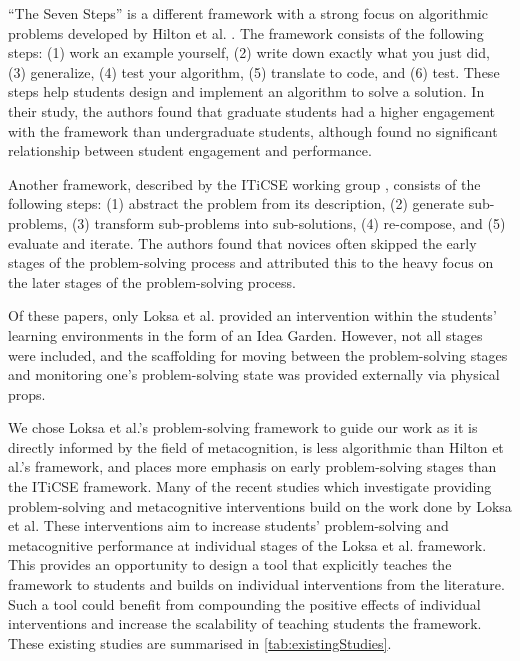 \documentclass[sigconf,anonymous]{acmart}
\begin{document}
“The Seven Steps” is a different framework with a strong focus on algorithmic problems developed by Hilton et al. \cite{hilton2019}. The framework consists of the following steps: (1) work an example yourself, (2) write down exactly what you just did, (3) generalize, (4) test your algorithm, (5) translate to code, and (6) test. These steps help students design and implement an algorithm to solve a solution. In their study, the authors found that graduate students had a higher engagement with the framework than undergraduate students, although found no significant relationship between student engagement and performance.

Another framework, described by the ITiCSE working group \cite{mccracken2001}, consists of the following steps: (1) abstract the problem from its description, (2) generate sub-problems, (3) transform sub-problems into sub-solutions, (4) re-compose, and (5) evaluate and iterate. The authors found that novices often skipped the early stages of the problem-solving process and attributed this to the heavy focus on the later stages of the problem-solving process.

Of these papers, only Loksa et al. provided an intervention within the students' learning environments in the form of an Idea Garden. However, not all stages were included, and the scaffolding for moving between the problem-solving stages and monitoring one's problem-solving state was provided externally via physical props.

We chose Loksa et al.'s problem-solving framework to guide our work as it is directly informed by the field of metacognition, is less algorithmic than Hilton et al.'s framework, and places more emphasis on early problem-solving stages than the ITiCSE framework. Many of the recent studies which investigate providing problem-solving and metacognitive interventions build on the work done by Loksa et al. These interventions aim to increase students' problem-solving and metacognitive performance at individual stages of the Loksa et al. framework. This provides an opportunity to design a tool that explicitly teaches the framework to students and builds on individual interventions from the literature. Such a tool could benefit from compounding the positive effects of individual interventions and increase the scalability of teaching students the framework. These existing studies are summarised in \autoref{tab:existingStudies}.
\end{document}
